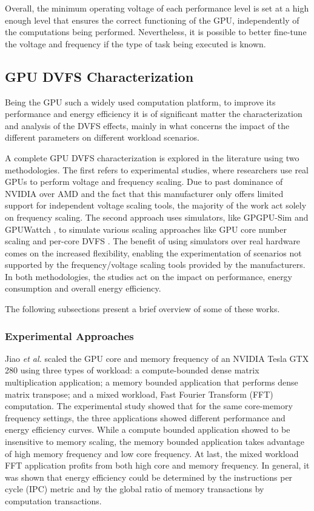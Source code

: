 Overall, the minimum operating voltage of each performance level is set at a high enough level that ensures the correct functioning of the GPU, independently of the computations being performed. Nevertheless, it is possible to better fine-tune the voltage and frequency if the type of task being executed is known.

\subsection{GPU DVFS Characterization}

Being the GPU such a widely used computation platform, to improve its performance and energy efficiency it is of significant matter the characterization and analysis of the DVFS effects, mainly in what concerns the impact of the different parameters on different workload scenarios. 

A complete GPU DVFS characterization is explored in the literature using two methodologies. The first refers to experimental studies, where researchers use real GPUs to perform voltage and frequency scaling. Due to past dominance of NVIDIA over AMD \cite{noauthor_jon_2018} \cite{mujtaba_amd_2019} and the fact that this manufacturer only offers limited support for independent voltage scaling tools, the majority of the work act solely on frequency scaling. The second approach uses simulators, like GPGPU-Sim \cite{noauthor_gpgpu-sim/gpgpu-sim_distribution_2019} and GPUWattch \cite{noauthor_gpu_2011} \cite{leng_gpuwattch:_2013},  to simulate various scaling approaches like GPU core number scaling and per-core DVFS \cite{mei_survey_2016}. The benefit of using simulators over real hardware comes on the increased flexibility, enabling the experimentation of scenarios not supported by the frequency/voltage scaling tools provided by the manufacturers. In both methodologies, the studies act on the impact on performance, energy consumption and overall energy efficiency.

The following subsections present a brief overview of some of these works.

\subsubsection{Experimental Approaches}

Jiao \textit{et al.} \cite{jiao_power_2010} scaled the GPU core and memory frequency of an NVIDIA Tesla GTX 280 using three types of workload: a compute-bounded dense matrix multiplication application; a memory bounded application that performs dense matrix transpose; and a mixed workload, Fast Fourier Transform (FFT) computation. The experimental study showed that for the same core-memory frequency settings, the three applications showed different performance and energy efficiency curves. While a compute bounded application showed to be insensitive to memory scaling, the memory bounded application takes advantage of high memory frequency and low core frequency. At last, the mixed workload FFT application profits from both high core and memory frequency. In general, it was shown that energy efficiency could be determined by the instructions per cycle (IPC) metric and by the global ratio of memory transactions by computation transactions.


